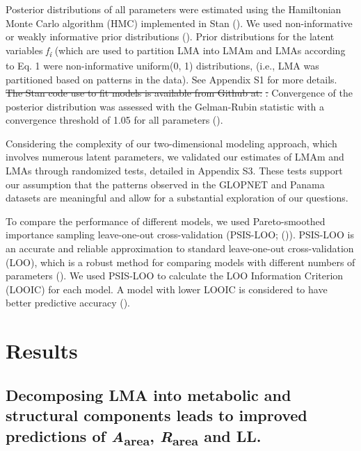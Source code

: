 \documentclass[
  12pt,
  letterpaper,
  DIV=11,
  numbers=noendperiod]{scrartcl}
\providecommand{\DIFdel}[1]{{\protect\color{red}\sout{#1}}}                      %
\providecommand{\DIFdelbegin}{} %
\providecommand{\DIFdelend}{} %
\newcommand{\DIFscaledelfig}{0.5}
\newlength{\DIFdelgraphicswidth} %
\newlength{\DIFdelgraphicsheight} %
\newcommand{\DIFdelincludegraphics}[2][]{%
\sbox{\DIFdelgraphicsbox}{\DIFOincludegraphics[#1]{#2}}%
\settoboxwidth{\DIFdelgraphicswidth}{\DIFdelgraphicsbox} %
\settoboxtotalheight{\DIFdelgraphicsheight}{\DIFdelgraphicsbox} %
\scalebox{\DIFscaledelfig}{%
\parbox[b]{\DIFdelgraphicswidth}{\usebox{\DIFdelgraphicsbox}\\[-\baselineskip] \rule{\DIFdelgraphicswidth}{0em}}\llap{\resizebox{\DIFdelgraphicswidth}{\DIFdelgraphicsheight}{%
\setlength{\unitlength}{\DIFdelgraphicswidth}%
\begin{picture}(1,1)%
\thicklines\linethickness{2pt} %
{\color[rgb]{1,0,0}\put(0,0){\framebox(1,1){}}}%
{\color[rgb]{1,0,0}\put(0,0){\line( 1,1){1}}}%
{\color[rgb]{1,0,0}\put(0,1){\line(1,-1){1}}}%
\end{picture}%
}\hspace*{3pt}}} %
} %
\DeclareRobustCommand{\DIFdelbegin}{\DIFOdelbegin \let\includegraphics\DIFdelincludegraphics} %
\DeclareRobustCommand{\DIFdelend}{\DIFOaddend \let\includegraphics\DIFOincludegraphics} %
\begin{document}
Posterior distributions of all parameters were estimated using the
Hamiltonian Monte Carlo algorithm (HMC) implemented in Stan
(). We used
non-informative or weakly informative prior distributions
(). Prior distributions for the
latent variables \emph{f\textsubscript{i}} (which are used to partition
LMA into LMAm and LMAs according to Eq. 1 were non-informative
uniform(0, 1) distributions, (i.e., LMA was partitioned based on
patterns in the data). See Appendix S1 for more details. \DIFdelbegin \DIFdel{The Stan code
use to fit models is available from Github at:
}%
\DIFdel{. }\DIFdelend Convergence of
the posterior distribution was assessed with the Gelman-Rubin statistic
with a convergence threshold of 1.05 for all parameters
().

Considering the complexity of our two-dimensional modeling approach,
which involves numerous latent parameters, we validated our estimates of
LMAm and LMAs through randomized tests, detailed in Appendix S3. These
tests support our assumption that the patterns observed in the GLOPNET
and Panama datasets are meaningful and allow for a substantial
exploration of our questions.

To compare the performance of different models, we used Pareto-smoothed
importance sampling leave-one-out cross-validation (PSIS-LOO;
()). PSIS-LOO is an
accurate and reliable approximation to standard leave-one-out
cross-validation (LOO), which is a robust method for comparing models
with different numbers of parameters (). We used PSIS-LOO to calculate the LOO Information
Criterion (LOOIC) for each model. A model with lower LOOIC is considered
to have better predictive accuracy ().

\section{Results}\label{results}

\subsection{\texorpdfstring{Decomposing LMA into metabolic and
structural components leads to improved predictions of
\emph{A}\textsubscript{area}, \emph{R}\textsubscript{area} and
LL.}{Decomposing LMA into metabolic and structural components leads to improved predictions of Aarea, Rarea and LL.}}\label{decomposing-lma-into-metabolic-and-structural-components-leads-to-improved-predictions-of-aarea-rarea-and-ll.}
\end{document}
